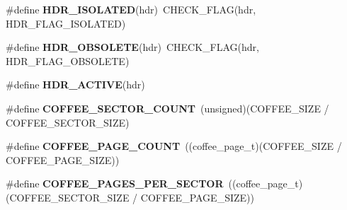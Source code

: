 \begin{DoxyCompactItemize}
\item 
\hypertarget{cfs-coffee_8c_a431fb8d4993e02fad46a5c790fbab63e}{}\#define {\bfseries H\+D\+R\+\_\+\+I\+S\+O\+L\+A\+T\+E\+D}(hdr)~C\+H\+E\+C\+K\+\_\+\+F\+L\+A\+G(hdr, H\+D\+R\+\_\+\+F\+L\+A\+G\+\_\+\+I\+S\+O\+L\+A\+T\+E\+D)\label{cfs-coffee_8c_a431fb8d4993e02fad46a5c790fbab63e}

\item 
\hypertarget{cfs-coffee_8c_a9039e95dea9c7d61300788188e97b827}{}\#define {\bfseries H\+D\+R\+\_\+\+O\+B\+S\+O\+L\+E\+T\+E}(hdr)~C\+H\+E\+C\+K\+\_\+\+F\+L\+A\+G(hdr, H\+D\+R\+\_\+\+F\+L\+A\+G\+\_\+\+O\+B\+S\+O\+L\+E\+T\+E)\label{cfs-coffee_8c_a9039e95dea9c7d61300788188e97b827}

\item 
\#define {\bfseries H\+D\+R\+\_\+\+A\+C\+T\+I\+V\+E}(hdr)
\item 
\hypertarget{cfs-coffee_8c_afa349df40fcdf75ba5ca9518c2904474}{}\#define {\bfseries C\+O\+F\+F\+E\+E\+\_\+\+S\+E\+C\+T\+O\+R\+\_\+\+C\+O\+U\+N\+T}~(unsigned)(C\+O\+F\+F\+E\+E\+\_\+\+S\+I\+Z\+E / C\+O\+F\+F\+E\+E\+\_\+\+S\+E\+C\+T\+O\+R\+\_\+\+S\+I\+Z\+E)\label{cfs-coffee_8c_afa349df40fcdf75ba5ca9518c2904474}

\item 
\hypertarget{cfs-coffee_8c_a6b4e1dcafdb1a482979600ee54a0b811}{}\#define {\bfseries C\+O\+F\+F\+E\+E\+\_\+\+P\+A\+G\+E\+\_\+\+C\+O\+U\+N\+T}~((coffee\+\_\+page\+\_\+t)(C\+O\+F\+F\+E\+E\+\_\+\+S\+I\+Z\+E / C\+O\+F\+F\+E\+E\+\_\+\+P\+A\+G\+E\+\_\+\+S\+I\+Z\+E))\label{cfs-coffee_8c_a6b4e1dcafdb1a482979600ee54a0b811}

\item 
\hypertarget{cfs-coffee_8c_a7ad75c388cab3f599b6c7d6b908979f9}{}\#define {\bfseries C\+O\+F\+F\+E\+E\+\_\+\+P\+A\+G\+E\+S\+\_\+\+P\+E\+R\+\_\+\+S\+E\+C\+T\+O\+R}~((coffee\+\_\+page\+\_\+t)(C\+O\+F\+F\+E\+E\+\_\+\+S\+E\+C\+T\+O\+R\+\_\+\+S\+I\+Z\+E / C\+O\+F\+F\+E\+E\+\_\+\+P\+A\+G\+E\+\_\+\+S\+I\+Z\+E))\label{cfs-coffee_8c_a7ad75c388cab3f599b6c7d6b908979f9}

\end{DoxyCompactItemize}
